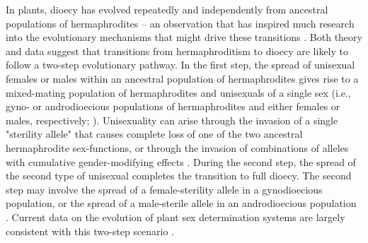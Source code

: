 \documentclass{article}
\begin{document}
In plants, dioecy has evolved repeatedly and independently from ancestral populations of hermaphrodites -- an observation that has inspired much research into the evolutionary mechanisms that might drive these transitions \citep{Westergaard1958, SakaiWeller1999, Charlesworth2006, Bachtrog2014, Renner2014, GoldbergOtto2017, KaferPannell2017}. Both theory and data suggest that transitions from hermaphroditism to dioecy are likely to follow a two-step evolutionary pathway. In the first step, the spread of unisexual females or males within an ancestral population of hermaphrodites gives rise to a mixed-mating population of hermaphrodites and unisexuals of a single sex (i.e., gyno- or androdioecious populations of hermaphrodites and either females or males, respectively; \citealt{Charlesworth1978a, Charlesworth1978b}). Unisexuality can arise through the invasion of a single "sterility allele" that causes complete loss of one of the two ancestral hermaphrodite sex-functions, or through the invasion of combinations of alleles with cumulative gender-modifying effects \citep{Charlesworth1978a, Charlesworth1978b, Charlesworth1999}. During the second step, the spread of the second type of unisexual completes the transition to full dioecy. The second step may involve the spread of a female-sterility allele in a gynodioecious population, or the spread of a male-sterile allele in an androdioecious population \citep{Westergaard1958, Charlesworth1978a, Charlesworth1978b, Charlesworth2006, Charlesworth2009, KaferPannell2017}. Current data on the evolution of plant sex determination systems are largely consistent with this two-step scenario \citep{Westergaard1958, Charlesworth2002, Charlesworth2006, Renner2014, Ashman2015}.
\end{document}
